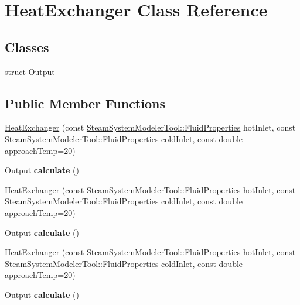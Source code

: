 \hypertarget{class_heat_exchanger}{}\section{Heat\+Exchanger Class Reference}
\label{class_heat_exchanger}
\subsection*{Classes}
\begin{DoxyCompactItemize}
\item 
struct \hyperlink{struct_heat_exchanger_1_1_output}{Output}
\end{DoxyCompactItemize}
\subsection*{Public Member Functions}
\begin{DoxyCompactItemize}
\item 
\hyperlink{class_heat_exchanger_adc897b215af3e2759c78edb2ef0b6bf9}{Heat\+Exchanger} (const \hyperlink{struct_steam_system_modeler_tool_1_1_fluid_properties}{Steam\+System\+Modeler\+Tool\+::\+Fluid\+Properties} hot\+Inlet, const \hyperlink{struct_steam_system_modeler_tool_1_1_fluid_properties}{Steam\+System\+Modeler\+Tool\+::\+Fluid\+Properties} cold\+Inlet, const double approach\+Temp=20)
\item 
\mbox{\label{class_heat_exchanger_a9322c6d0f9a33866e35157203eaf0ec6}} 
\hyperlink{struct_heat_exchanger_1_1_output}{Output} {\bfseries calculate} ()
\item 
\hyperlink{class_heat_exchanger_adc897b215af3e2759c78edb2ef0b6bf9}{Heat\+Exchanger} (const \hyperlink{struct_steam_system_modeler_tool_1_1_fluid_properties}{Steam\+System\+Modeler\+Tool\+::\+Fluid\+Properties} hot\+Inlet, const \hyperlink{struct_steam_system_modeler_tool_1_1_fluid_properties}{Steam\+System\+Modeler\+Tool\+::\+Fluid\+Properties} cold\+Inlet, const double approach\+Temp=20)
\item 
\mbox{\label{class_heat_exchanger_a9322c6d0f9a33866e35157203eaf0ec6}} 
\hyperlink{struct_heat_exchanger_1_1_output}{Output} {\bfseries calculate} ()
\item 
\hyperlink{class_heat_exchanger_adc897b215af3e2759c78edb2ef0b6bf9}{Heat\+Exchanger} (const \hyperlink{struct_steam_system_modeler_tool_1_1_fluid_properties}{Steam\+System\+Modeler\+Tool\+::\+Fluid\+Properties} hot\+Inlet, const \hyperlink{struct_steam_system_modeler_tool_1_1_fluid_properties}{Steam\+System\+Modeler\+Tool\+::\+Fluid\+Properties} cold\+Inlet, const double approach\+Temp=20)
\item 
\mbox{\label{class_heat_exchanger_a9322c6d0f9a33866e35157203eaf0ec6}} 
\hyperlink{struct_heat_exchanger_1_1_output}{Output} {\bfseries calculate} ()
\end{DoxyCompactItemize}
